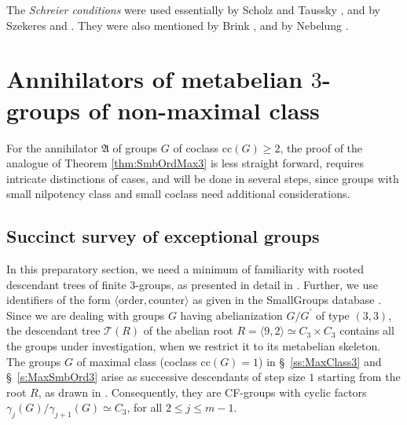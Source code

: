 \documentclass{amsart}
\theoremstyle{definition}
\numberwithin{equation}{section}
\begin{document}
The \textit{Schreier conditions} were used essentially
by Scholz and Taussky
\cite[(1)--(5), p. 32]{SoTa},
and by Szekeres
\cite[(3.17)--(3.22), pp. 280--281]{Sz1}
and
\cite[(5.12)--(5.15), pp. 344--345]{Sz2}.
They were also mentioned
by Brink
\cite[p. 32]{Br},
and by Nebelung
\cite[p. 14, and Satz 2.4.5 (iv), p. 45]{Ne1}.



\section{Annihilators of metabelian \(3\)-groups of non-maximal class}
\label{s:LowSmbOrd}

\noindent
For the annihilator \(\mathfrak{A}\) of groups \(G\) of coclass \(\mathrm{cc}(G)\ge 2\),
the proof of the analogue of Theorem
\ref{thm:SmbOrdMax3}
is less straight forward,
requires intricate distinctions of cases,
and will be done in several steps,
since groups with small nilpotency class and small coclass need
additional considerations.



\subsection{Succinct survey of exceptional groups}
\label{ss:Exceptions}

\noindent
In this preparatory section,
we need a minimum of familiarity with rooted descendant trees of finite \(3\)-groups,
as presented in detail in
\cite{Ma6}.
Further, we use identifiers of the form \(\langle\text{order},\text{counter}\rangle\)
as given in the SmallGroups database
\cite{BEO1,BEO2}.
Since we are dealing with groups \(G\) having abelianization \(G/G^\prime\) of type \((3,3)\),
the descendant tree \(\mathcal{T}(R)\) of the abelian root \(R=\langle 9,2\rangle\simeq C_3\times C_3\)
contains all the groups under investigation,
when we restrict it to its metabelian skeleton.
The groups \(G\) of maximal class (coclass \(\mathrm{cc}(G)=1\)) in \S\ 
\ref{ss:MaxClass3}
and \S\
\ref{s:MaxSmbOrd3}
arise as successive descendants of step size \(1\) starting from the root \(R\),
as drawn in
\cite[Fig. 3, p. 167]{Ma6}.
Consequently,
they are CF-groups with cyclic factors \(\gamma_j(G)/\gamma_{j+1}(G)\simeq C_3\), for all \(2\le j\le m-1\).
\end{document}
